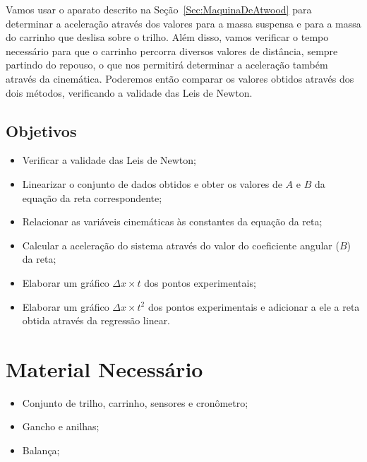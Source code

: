 Vamos usar o aparato descrito na Seção~\ref{Sec:MaquinaDeAtwood} para determinar a aceleração através dos valores para a massa suspensa e para a massa do carrinho que deslisa sobre o trilho. Além disso, vamos verificar o tempo necessário para que o carrinho percorra diversos valores de distância, sempre partindo do repouso, o que nos permitirá determinar a aceleração também através da cinemática. Poderemos então comparar os valores obtidos através dos dois métodos, verificando a validade das Leis de Newton.

\subsection{Objetivos}

\begin{itemize}
     \item Verificar a validade das Leis de Newton;
	 \item Linearizar o conjunto de dados obtidos e obter os valores de $A$ e $B$ da equação da reta correspondente;
	 \item Relacionar as variáveis cinemáticas às constantes da equação da reta;
     \item Calcular a aceleração do sistema através do valor do coeficiente angular ($B$) da reta;
     \item Elaborar um gráfico $\Delta x \times t$ dos pontos experimentais;
	 \item Elaborar um gráfico $\Delta x \times t^2$ dos pontos experimentais e adicionar a ele a reta obtida através da regressão linear.
\end{itemize}

\section{Material Necessário}

\begin{itemize}
	\item Conjunto de trilho, carrinho, sensores e cronômetro;
	\item Gancho e anilhas;
	\item Balança;
\end{itemize}

